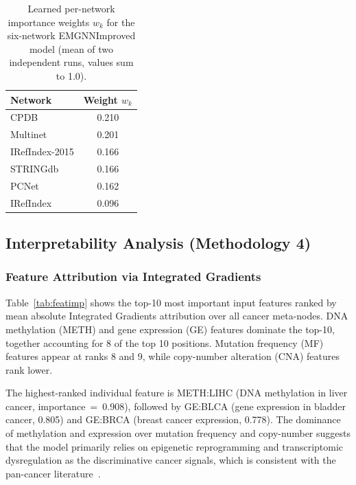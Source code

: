 \begin{table}[ht]
  \centering
  \caption{Learned per-network importance weights $w_k$ for the six-network EMGNNImproved
           model (mean of two independent runs, values sum to 1.0).}
  \label{tab:netweights}
  \small
  \begin{tabular}{lc}
    \toprule
    \textbf{Network} & \textbf{Weight $w_k$} \\
    \midrule
    CPDB            & 0.210 \\
    Multinet        & 0.201 \\
    IRefIndex-2015  & 0.166 \\
    STRINGdb        & 0.166 \\
    PCNet           & 0.162 \\
    IRefIndex       & 0.096 \\
    \bottomrule
  \end{tabular}
\end{table}

\subsection{Interpretability Analysis (Methodology 4)}

\subsubsection{Feature Attribution via Integrated Gradients}

Table~\ref{tab:featimp} shows the top-10 most important
input features ranked by mean absolute Integrated Gradients attribution over all cancer
meta-nodes. DNA methylation (METH) and gene expression (GE) features dominate the
top-10, together accounting for 8 of the top 10 positions. Mutation frequency (MF)
features appear at ranks 8 and 9, while copy-number alteration (CNA) features rank lower.

The highest-ranked individual feature is METH:LIHC (DNA methylation in liver cancer,
importance~=~0.908), followed by GE:BLCA (gene expression in bladder cancer, 0.805) and
GE:BRCA (breast cancer expression, 0.778). The dominance of methylation and expression
over mutation frequency and copy-number suggests that the model primarily relies on
epigenetic reprogramming and transcriptomic dysregulation as the discriminative cancer
signals, which is consistent with the pan-cancer literature~\cite{emogi2021}.

